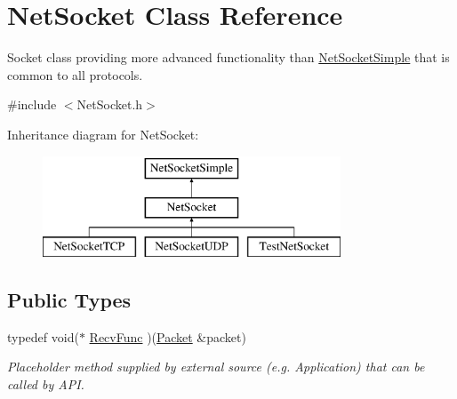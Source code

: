 \hypertarget{class_net_socket}{
\section{NetSocket Class Reference}
\label{class_net_socket}
}


Socket class providing more advanced functionality than \hyperlink{class_net_socket_simple}{NetSocketSimple} that is common to all protocols.  




{\ttfamily \#include $<$NetSocket.h$>$}

Inheritance diagram for NetSocket:\begin{figure}[H]
\begin{center}
\leavevmode
\includegraphics[height=3.000000cm]{class_net_socket}
\end{center}
\end{figure}
\subsection*{Public Types}
\begin{DoxyCompactItemize}
\item 
\hypertarget{class_net_socket_a52b5f4de8d0a47fd8620f542b21c076c}{
typedef void($\ast$ \hyperlink{class_net_socket_a52b5f4de8d0a47fd8620f542b21c076c}{RecvFunc} )(\hyperlink{class_packet}{Packet} \&packet)}
\label{class_net_socket_a52b5f4de8d0a47fd8620f542b21c076c}

\begin{DoxyCompactList}\small\item\em Placeholder method supplied by external source (e.g. Application) that can be called by API. \item\end{DoxyCompactList}\end{DoxyCompactItemize}
